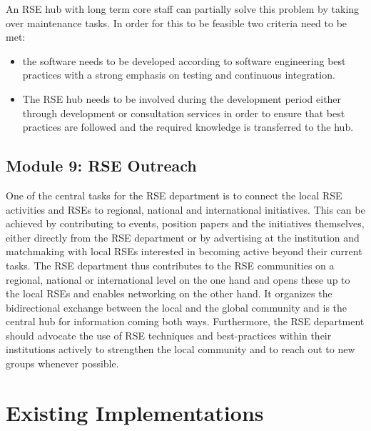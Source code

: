 \documentclass[a4paper]{article}
\begin{document}
An RSE hub with long term core staff can partially solve this problem by taking over maintenance tasks.
In order for this to be feasible two criteria need to be met:
\begin{itemize}
\item the software needs to be developed according to software engineering best practices with a strong emphasis on testing and continuous integration.
\item The RSE hub needs to be involved during the development period either through development or consultation services in order to ensure that best practices are followed and the required knowledge is transferred to the hub.
\end{itemize}

\subsection{Module 9: RSE Outreach}
\label{sec:outreach}

One of the central tasks for the RSE department is to connect the local RSE activities and RSEs to regional, national and international initiatives.
This can be achieved by contributing to events, position papers and the initiatives themselves,
either directly from the RSE department or by advertising at the institution and matchmaking with local RSEs interested in becoming active beyond their current tasks.
The RSE department thus contributes to the RSE communities on a regional, national or international level on the one hand and opens these up to the local RSEs and enables networking on the other hand.
It organizes the bidirectional exchange between the local and the global community and is the central hub for information coming both ways.
Furthermore, the RSE department should advocate the use of RSE techniques and best-practices within their institutions actively to strengthen the local community and to reach out to new groups whenever possible.

\section{Existing Implementations}
\end{document}
